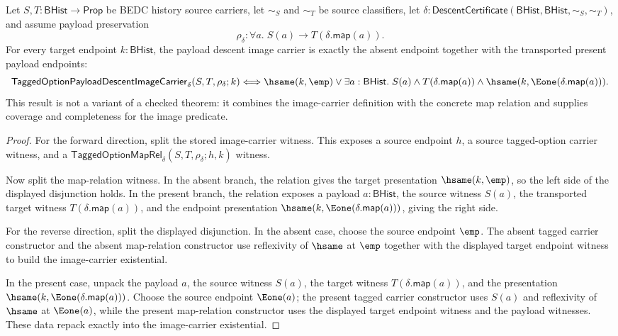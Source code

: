 \begin{theorem}
\label{thm:tagged-option-payload-descent-image-branch-exactness}
Let $S,T:\mathsf{BHist}\to\mathsf{Prop}$ be BEDC history source carriers, let
$\sim_S$ and $\sim_T$ be source classifiers, let
$\delta:\mathsf{DescentCertificate}(\mathsf{BHist},\mathsf{BHist},\sim_S,\sim_T)$,
and assume payload preservation
$$
\rho_{\delta}:\forall a.\;S(a)\to T(\delta.\mathsf{map}(a)).
$$
For every target endpoint $k:\mathsf{BHist}$, the payload descent image carrier is
exactly the absent endpoint together with the transported present payload
endpoints:
$$
\mathsf{TaggedOptionPayloadDescentImageCarrier}_{\delta}(S,T,\rho_{\delta};k)
\Longleftrightarrow
\hsame(k,\emp)\lor
\exists a:\mathsf{BHist}.\;
S(a)\land T(\delta.\mathsf{map}(a))\land
\hsame(k,\Eone(\delta.\mathsf{map}(a))).
$$
This result is not a variant of a checked theorem: it combines the image-carrier
definition with the concrete map relation and supplies coverage and completeness
for the image predicate.
\end{theorem}
\begin{proof}
For the forward direction, split the stored image-carrier witness. This exposes a
source endpoint $h$, a source tagged-option carrier witness, and a
$\mathsf{TaggedOptionMapRel}_{\delta}(S,T,\rho_{\delta};h,k)$ witness.

Now split the map-relation witness. In the absent branch, the relation gives the
target presentation $\hsame(k,\emp)$, so the left side of the displayed
disjunction holds. In the present branch, the relation exposes a payload
$a:\mathsf{BHist}$, the source witness $S(a)$, the transported target witness
$T(\delta.\mathsf{map}(a))$, and the endpoint presentation
$\hsame(k,\Eone(\delta.\mathsf{map}(a)))$, giving the right side.

For the reverse direction, split the displayed disjunction. In the absent case,
choose the source endpoint $\emp$. The absent tagged carrier constructor and the
absent map-relation constructor use reflexivity of $\hsame$ at $\emp$ together
with the displayed target endpoint witness to build the image-carrier
existential.

In the present case, unpack the payload $a$, the source witness $S(a)$, the target
witness $T(\delta.\mathsf{map}(a))$, and the presentation
$\hsame(k,\Eone(\delta.\mathsf{map}(a)))$. Choose the source endpoint
$\Eone(a)$; the present tagged carrier constructor uses $S(a)$ and reflexivity of
$\hsame$ at $\Eone(a)$, while the present map-relation constructor uses the
displayed target endpoint witness and the payload witnesses. These data repack
exactly into the image-carrier existential.
\end{proof}

